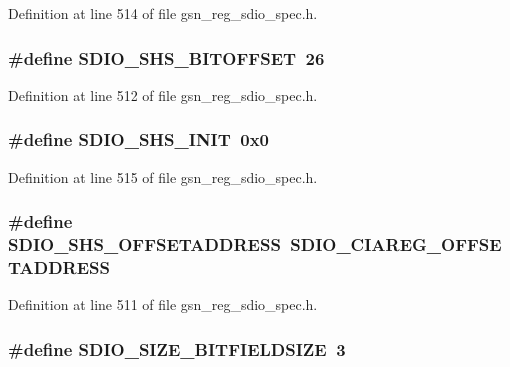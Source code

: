 Definition at line 514 of file gsn\_\-reg\_\-sdio\_\-spec.h.

\hypertarget{a00571_ab3da35dd441b9fc0225fd027dd8e782a}{
\subsubsection[{SDIO\_\-SHS\_\-BITOFFSET}]{\setlength{\rightskip}{0pt plus 5cm}\#define SDIO\_\-SHS\_\-BITOFFSET~26}}
\label{a00571_ab3da35dd441b9fc0225fd027dd8e782a}


Definition at line 512 of file gsn\_\-reg\_\-sdio\_\-spec.h.

\hypertarget{a00571_ae83d47857bea97a6ffa28bab2d467d75}{
\subsubsection[{SDIO\_\-SHS\_\-INIT}]{\setlength{\rightskip}{0pt plus 5cm}\#define SDIO\_\-SHS\_\-INIT~0x0}}
\label{a00571_ae83d47857bea97a6ffa28bab2d467d75}


Definition at line 515 of file gsn\_\-reg\_\-sdio\_\-spec.h.

\hypertarget{a00571_a9138e2b54a267468f859752d8fb85eda}{
\subsubsection[{SDIO\_\-SHS\_\-OFFSETADDRESS}]{\setlength{\rightskip}{0pt plus 5cm}\#define SDIO\_\-SHS\_\-OFFSETADDRESS~SDIO\_\-CIAREG\_\-OFFSETADDRESS}}
\label{a00571_a9138e2b54a267468f859752d8fb85eda}


Definition at line 511 of file gsn\_\-reg\_\-sdio\_\-spec.h.

\hypertarget{a00571_ab39390c380788ef6956075d311baf901}{
\subsubsection[{SDIO\_\-SIZE\_\-BITFIELDSIZE}]{\setlength{\rightskip}{0pt plus 5cm}\#define SDIO\_\-SIZE\_\-BITFIELDSIZE~3}}
\label{a00571_ab39390c380788ef6956075d311baf901}


